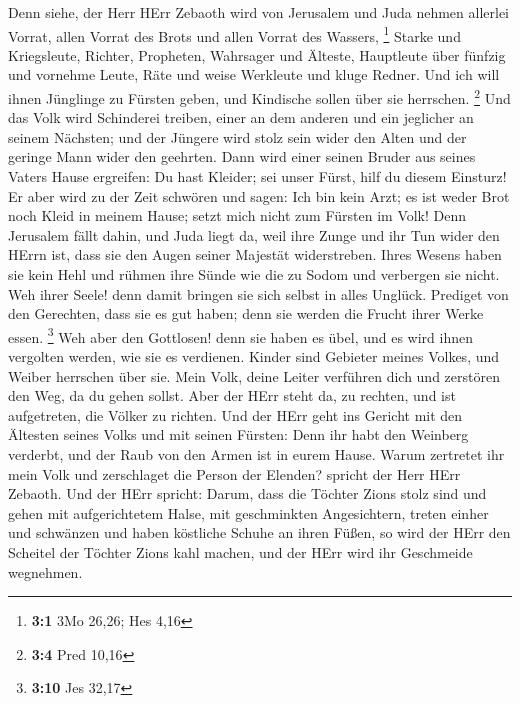  Denn siehe, der Herr HErr Zebaoth wird von Jerusalem und
Juda nehmen allerlei Vorrat, allen Vorrat des Brots und allen Vorrat des
Wassers, \footnote{\textbf{3:1} 3Mo 26,26; Hes 4,16}  Starke
und Kriegsleute, Richter, Propheten, Wahrsager und Älteste, 
Hauptleute über fünfzig und vornehme Leute, Räte und weise Werkleute und
kluge Redner.  Und ich will ihnen Jünglinge zu Fürsten
geben, und Kindische sollen über sie herrschen. \footnote{\textbf{3:4}
  Pred 10,16}  Und das Volk wird Schinderei treiben, einer
an dem anderen und ein jeglicher an seinem Nächsten; und der Jüngere
wird stolz sein wider den Alten und der geringe Mann wider den geehrten.
 Dann wird einer seinen Bruder aus seines Vaters Hause
ergreifen: Du hast Kleider; sei unser Fürst, hilf du diesem Einsturz!
 Er aber wird zu der Zeit schwören und sagen: Ich bin kein
Arzt; es ist weder Brot noch Kleid in meinem Hause; setzt mich nicht zum
Fürsten im Volk!  Denn Jerusalem fällt dahin, und Juda liegt
da, weil ihre Zunge und ihr Tun wider den HErrn ist, dass sie den Augen
seiner Majestät widerstreben.  Ihres Wesens haben sie kein
Hehl und rühmen ihre Sünde wie die zu Sodom und verbergen sie nicht. Weh
ihrer Seele! denn damit bringen sie sich selbst in alles Unglück.
 Prediget von den Gerechten, dass sie es gut haben; denn
sie werden die Frucht ihrer Werke essen. \footnote{\textbf{3:10} Jes
  32,17}  Weh aber den Gottlosen! denn sie haben es übel,
und es wird ihnen vergolten werden, wie sie es verdienen. 
Kinder sind Gebieter meines Volkes, und Weiber herrschen über sie. Mein
Volk, deine Leiter verführen dich und zerstören den Weg, da du gehen
sollst.  Aber der HErr steht da, zu rechten, und ist
aufgetreten, die Völker zu richten.  Und der HErr geht ins
Gericht mit den Ältesten seines Volks und mit seinen Fürsten: Denn ihr
habt den Weinberg verderbt, und der Raub von den Armen ist in eurem
Hause.  Warum zertretet ihr mein Volk und zerschlaget die
Person der Elenden? spricht der Herr HErr Zebaoth.  Und der
HErr spricht: Darum, dass die Töchter Zions stolz sind und gehen mit
aufgerichtetem Halse, mit geschminkten Angesichtern, treten einher und
schwänzen und haben köstliche Schuhe an ihren Füßen,  so
wird der HErr den Scheitel der Töchter Zions kahl machen, und der HErr
wird ihr Geschmeide wegnehmen.

